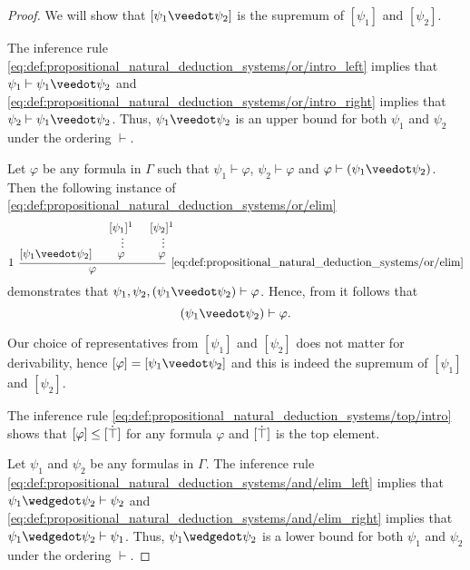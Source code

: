 \begin{proof}
   We will show that \( [\psi_1 \synvee \psi_2] \) is the supremum of \( [\psi_1] \) and \( [\psi_2] \).

  The inference rule \eqref{eq:def:propositional_natural_deduction_systems/or/intro_left} implies that \( \psi_1 \vdash \psi_1 \synvee \psi_2 \) and \eqref{eq:def:propositional_natural_deduction_systems/or/intro_right} implies that \( \psi_2 \vdash \psi_1 \synvee \psi_2 \). Thus, \( \psi_1 \synvee \psi_2 \) is an upper bound for both \( \psi_1 \) and \( \psi_2 \) under the ordering \( \vdash \).

  Let \( \varphi \) be any formula in \( \Gamma \) such that \( \psi_1 \vdash \varphi \), \( \psi_2 \vdash \varphi \) and \( \varphi \vdash (\psi_1 \synvee \psi_2) \). Then the following instance of \eqref{eq:def:propositional_natural_deduction_systems/or/elim}
  \begin{equation*}
    \begin{prooftree}
      \hypo{ [\psi_1 \synvee \psi_2] }
      \hypo{ [\psi_1]^1 }
      \ellipsis {} { \varphi }
      \hypo{ [\psi_2]^1 }
      \ellipsis {} { \varphi }
      \infer[left label=\( 1 \)]3[\ref{eq:def:propositional_natural_deduction_systems/or/elim}]{ \varphi }
    \end{prooftree}
  \end{equation*}
  demonstrates that \( \psi_1, \psi_2, (\psi_1 \synvee \psi_2) \vdash \varphi \). Hence, from  it follows that
  \begin{equation*}
    (\psi_1 \synvee \psi_2) \vdash \varphi.
  \end{equation*}

  Our choice of representatives from \( [\psi_1] \) and \( [\psi_2] \) does not matter for derivability, hence \( [\varphi] = [\psi_1 \synvee \psi_2] \) and this is indeed the supremum of \( [\psi_1] \) and \( [\psi_2] \).

   The inference rule \eqref{eq:def:propositional_natural_deduction_systems/top/intro} shows that \( [\varphi] \leq [\dot\top] \) for any formula \( \varphi \) and \( [\dot\top] \) is the top element.

   Let \( \psi_1 \) and \( \psi_2 \) be any formulas in \( \Gamma \). The inference rule \eqref{eq:def:propositional_natural_deduction_systems/and/elim_left} implies that \( \psi_1 \synwedge \psi_2 \vdash \psi_2 \) and \eqref{eq:def:propositional_natural_deduction_systems/and/elim_right} implies that \( \psi_1 \synwedge \psi_2 \vdash \psi_1 \). Thus, \( \psi_1 \synwedge \psi_2 \) is a lower bound for both \( \psi_1 \) and \( \psi_2 \) under the ordering \( \vdash \).


\end{proof}
